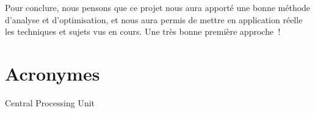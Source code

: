\documentclass[12pt,a4paper]{article}
\begin{document}
Pour conclure, nous pensons que ce projet nous aura apporté une bonne méthode
d'analyse et d'optimisation, et nous aura permis de mettre en application réelle
les techniques et sujets vus en cours. Une très bonne première approche !


\newpage
\section*{Acronymes}

\begin{acronym}
      {Central Processing Unit}
\end{acronym}
\end{document}
